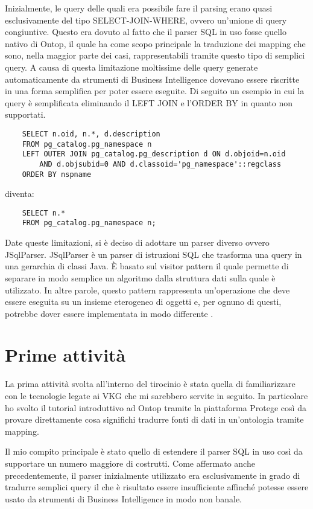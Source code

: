 Inizialmente, le query delle quali era possibile fare il parsing erano quasi esclusivamente del tipo SELECT-JOIN-WHERE, ovvero un'unione di query congiuntive. Questo era dovuto al fatto che il parser SQL in uso fosse quello nativo di Ontop,
il quale ha come scopo principale la traduzione dei mapping che sono, nella maggior parte dei casi, rappresentabili tramite questo tipo di semplici query.
A causa di questa limitazione moltissime delle query generate automaticamente da strumenti di Business Intelligence dovevano essere riscritte in una forma semplifica per poter essere eseguite.
Di seguito un esempio in cui la query è semplificata eliminando il LEFT JOIN e l'ORDER BY in quanto non supportati.
\begin{verbatim}
    SELECT n.oid, n.*, d.description 
    FROM pg_catalog.pg_namespace n
    LEFT OUTER JOIN pg_catalog.pg_description d ON d.objoid=n.oid 
        AND d.objsubid=0 AND d.classoid='pg_namespace'::regclass
    ORDER BY nspname
\end{verbatim}    
diventa:
\begin{verbatim}
    SELECT n.* 
    FROM pg_catalog.pg_namespace n;
\end{verbatim}

Date queste limitazioni, si è deciso di adottare un parser diverso ovvero JSqlParser. JSqlParser è un parser di istruzioni SQL
che trasforma una query in una gerarchia di classi Java. \`E basato sul visitor pattern il quale permette di separare in modo semplice un algoritmo dalla struttura dati sulla quale è utilizzato.
In altre parole, questo pattern rappresenta un'operazione che deve essere eseguita su un insieme eterogeneo di oggetti e, per ognuno di questi, potrebbe dover essere implementata in modo differente \cite{JSqlParser}.

\section{Prime attività}
\label{sec:prerequisits}
La prima attività svolta all'interno del tirocinio è stata quella di familiarizzare con le tecnologie legate ai VKG che mi sarebbero servite in seguito. In particolare ho svolto
il tutorial introduttivo ad Ontop tramite la piattaforma Protege così da provare direttamente cosa significhi tradurre fonti di dati in un'ontologia tramite mapping.

Il mio compito principale è stato quello di estendere il parser SQL in uso così da supportare un numero maggiore di costrutti. Come affermato anche precedentemente, il parser inizialmente utilizzato era
esclusivamente in grado di tradurre semplici query il che è risultato essere insufficiente affinché potesse essere usato da strumenti di Business Intelligence in modo non banale.

